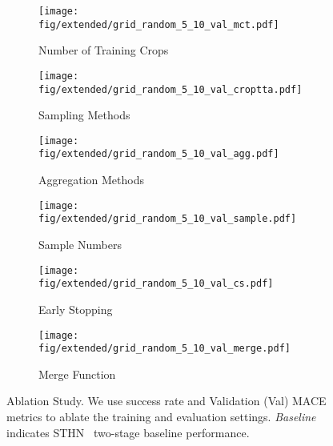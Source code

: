 \begin{figure*}[]
\begin{subfigure}[b]{0.33\textwidth}
    \texttt{[image: fig/extended/grid\_random\_5\_10\_val\_mct.pdf]}\vspace{-10pt}
    \caption{Number of Training Crops}
    
    \label{mct}
\end{subfigure}
\begin{subfigure}[b]{0.33\textwidth}
    \texttt{[image: fig/extended/grid\_random\_5\_10\_val\_croptta.pdf]}\vspace{-10pt}
    \caption{Sampling Methods}
    \label{croptta}
\end{subfigure}
\begin{subfigure}[b]{0.33\textwidth}
    \texttt{[image: fig/extended/grid\_random\_5\_10\_val\_agg.pdf]}\vspace{-10pt}
    \caption{Aggregation Methods}
    \label{agg}
\end{subfigure}
\begin{subfigure}[b]{0.33\textwidth}
    \texttt{[image: fig/extended/grid\_random\_5\_10\_val\_sample.pdf]}\vspace{-10pt}
    \caption{Sample Numbers}
    \label{sample}
\end{subfigure}
\begin{subfigure}[b]{0.33\textwidth}
    \texttt{[image: fig/extended/grid\_random\_5\_10\_val\_cs.pdf]}\vspace{-10pt}
    \caption{Early Stopping}
    \label{cs}
\end{subfigure}
\begin{subfigure}[b]{0.33\textwidth}
    \texttt{[image: fig/extended/grid\_random\_5\_10\_val\_merge.pdf]}\vspace{-10pt}
    \caption{Merge Function}
    \label{merge}
\end{subfigure}
    \caption{Ablation Study. We use success rate and Validation (Val) MACE metrics to ablate the training and evaluation settings. \textit{Baseline} indicates STHN~\cite{STHN} two-stage baseline performance.}
    \label{ablation}
\vspace{-15pt}
\end{figure*}


